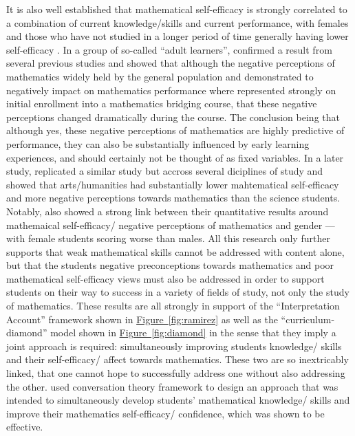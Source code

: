 \documentclass[twoside,12pt,a4paper]{report}
\newcommand{\reffig}[1]{\hyperref[fig:#1]{Figure~\ref{fig:#1}}}
\begin{document}
 It is also well established that mathematical self-efficacy is strongly correlated to a combination of current knowledge/skills and current performance, with females and those who have not studied in a longer period of time generally having lower self-efficacy \cite{Carmichael2006, Carmichael2005}. In a group of so-called ``adult learners'',  confirmed a result from several previous studies and showed that although the negative perceptions of mathematics widely held by the general population and demonstrated to negatively impact on mathematics performance where represented strongly on initial enrollment into a mathematics bridging course, that these negative perceptions changed dramatically during the course. The conclusion being that although yes, these negative perceptions of mathematics are highly predictive of performance, they can also be substantially influenced by early learning experiences, and should certainly not be thought of as fixed variables. In a later study,  replicated a similar study but accross several diciplines of study and showed that arts/humanities had substantially lower mahtematical self-efficacy and more negative perceptions towards mathematics than the science students. Notably,   also showed a strong link between their quantitative results around mathemaical self-efficacy/ negative perceptions of mathematics and gender --- with female students scoring worse than males. All this research only further supports that weak mathematical skills cannot be addressed with content alone, but that the students negative preconceptions towards mathematics and poor mathematical self-efficacy views must also be addressed in order to support students on their way to success in a variety of fields of study, not only the study of mathematics. These results are all strongly in support of the  ``Interpretation Account'' framework shown in \reffig{ramirez} as well as the ``curriculum-diamond'' model shown in \reffig{diamond} in the sense that they imply a joint approach is required: simultaneously improving students knowledge/ skills and their self-efficacy/ affect towards mathematics. These two are so inextricably linked, that one cannot hope to successfully address one without also addressing the other. \cite{Taylor2006} used conversation theory framework to design an approach that was intended to simultaneously develop students' mathematical knowledge/ skills  and improve their mathematics self-efficacy/ confidence, which was shown to be effective. 
\end{document}

